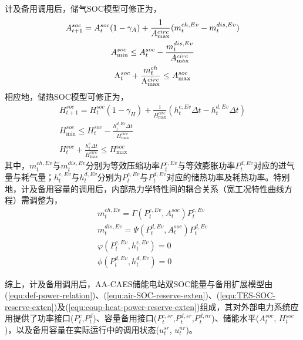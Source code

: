 计及备用调用后，储气SOC模型可修正为，
\begin{subequations}
\label{equ:air-SOC-reserve-exten}
\begin{gather}
A_{t + 1}^{soc} = A_t^{soc}(1-\gamma_A) + \frac{1}{{{A_{\max}^{circ}}}}({m_t^{ch,Ev} - m_t^{dis,Ev}})\\
A_{\min }^{soc} \le A_t^{soc} - \frac{{m_t^{dis,Ev}}}{{{A_{\max}^{circ}}}}\\
{\rm{A}}_t^{soc} + \frac{{m_t^{ch}}}{{{{\rm{A}}_{\max}^{circ}}}} \le A_{\max }^{soc}
\end{gather}
\end{subequations}
相应地，储热SOC模型可修正为，
\begin{subequations}
\label{equ:TES-SOC-reserve-exten}
\begin{gather}
H_{t + 1}^{soc} = H_t^{soc}(1-\gamma_H) + \frac{1}{{{H_{\max}^{circ}}}}({h_t^{c,Ev}\Delta t - h_t^{d,Ev}\Delta t})\\
H_{\min }^{soc} \le H_t^{soc} - \frac{{h_t^{d,Ev}\Delta t}}{{{H_{\max}^{circ}}}}\\
H_t^{soc} + \frac{{h_t^c\Delta t}}{{{H_{\max}^{circ}}}} \le H_{\max }^{soc}
\end{gather}
\end{subequations}
其中，$m_t^{ch,Ev}$与$m_t^{dis,Ev}$分别为等效压缩功率$P_t^{c,Ev}$与等效膨胀功率$P_t^{d,Ev}$对应的进气量与耗气量；$h_t^{c,Ev}$与$h_t^{d,Ev}$分别为$P_t^{c,Ev}$与$P_t^{d,Ev}$对应的储热功率及耗热功率。特别地，计及备用容量的调用后，内部热力学特性间的耦合关系（宽工况特性曲线方程）需调整为，
\begin{subequations}
\label{equ:coup-heat-power-reserve-exten}
\begin{gather}
m_t^{ch,Ev} = \Gamma ({P_t^{c,Ev},A_t^{soc}})P_t^{c,Ev}\\
m_t^{dis,Ev} = \Psi ({P_t^{d,Ev},A_t^{soc}})P_t^{d,Ev}\\
\varphi ({P_t^{c,Ev},h_t^{c,Ev}}) = 0\\
\phi ({P_t^{d,Ev},h_t^{d,Ev}}) = 0
\end{gather}
\end{subequations}

综上，计及备用调用后，AA-CAES储能电站双SOC能量与备用扩展模型由(\ref{equ:def-power-relation})、(\ref{equ:air-SOC-reserve-exten})、(\ref{equ:TES-SOC-reserve-exten})及(\ref{equ:coup-heat-power-reserve-exten})组成，其对外部电力系统应用提供了功率接口($P_t^c$,$P_t^d$)、容量备用接口($P_t^{c,sr}$,$P_t^{d,sr}$,$P_t^{d,nr}$)、储能水平($A_t^{soc}$, $H_t^{soc}$)，以及备用容量在实际运行中的调用状态($u_t^{sr}$, $u_t^{nr}$)。


